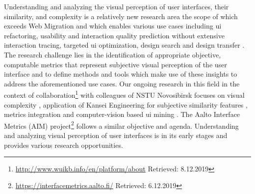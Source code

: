 Understanding and analyzing the visual perception of user interfaces, their similarity, and complexity is a relatively new research area the scope of which exceeds \gls{Web Migration} and which enables various use cases including \gls{ui} refactoring, usability and interaction quality prediction without extensive interaction tracing, targeted \gls{ui} optimization, design search and design transfer \autocite{Bakaev2019JWE}.
The research challenge lies in the identification of appropriate objective, computable metrics that represent subjective visual perception of the user interface and to define methods and tools which make use of these insights to address the aforementioned use cases.
Our ongoing research in this field in the context of collaboration\footnote{\url{http://www.wuikb.info/en/platform/about} Retrieved: 8.12.2019} with colleagues of NSTU Novosibirsk focuses on visual complexity \autocite{Bakaev2018APEIE}, application of Kansei Engineering for subjective similarity features \autocite{Bakaev2017Kansei}, metrics integration \autocite{Bakaev2019ICWE} and computer-vision based \gls{ui} mining \autocite{Bakaev2018ICWE}.
The Aalto Interface Metrics (AIM) \autocite{Oulasvirta2018AIM} project\footnote{\url{https://interfacemetrics.aalto.fi/} Retrieved: 6.12.2019} follows a similar objective and agenda.
Understanding and analyzing visual perception of user interfaces is in its early stages and provides various research opportunities.
%
%
%
